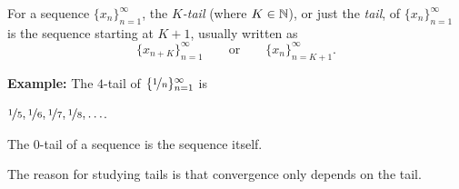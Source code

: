 \documentclass[10pt,aspectratio=149]{beamer}
\begin{document}
\begin{frame}

\begin{definition}
For a sequence $\{ x_n \}_{n=1}^\infty$,
the \emph{$K$-tail} (where $K \in {\mathbb{N}}$),
or just the
\emph{tail}, of
$\{ x_n \}_{n=1}^\infty$ is the sequence starting at $K+1$, usually written as
\begin{equation*}
\{ x_{n+K} \}_{n=1}^\infty
\qquad \text{or} \qquad \{ x_n \}_{n=K+1}^\infty .
\end{equation*}
\end{definition}

\pause

\textbf{Example:}
The $4$-tail of $\{ \nicefrac{1}{n} \}_{n=1}^\infty$ is

$\nicefrac{1}{5}, \nicefrac{1}{6}, \nicefrac{1}{7}, \nicefrac{1}{8},
\ldots$.

\medskip
\pause

The $0$-tail of a sequence is the sequence itself.

\medskip
\pause

The reason for studying tails is that convergence only depends on the tail.

\end{frame}
\end{document}
